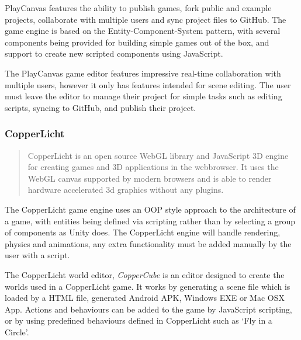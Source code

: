 \documentclass[a4paper, 12pt]{article}
\begin{document}
PlayCanvas features the ability to publish games, fork public and example projects, collaborate with multiple users and sync project files to GitHub. The game engine is based on the Entity-Component-System pattern, with several components being provided for building simple games out of the box, and support to create new scripted components using JavaScript.\cite{playcanvas}

The PlayCanvas game editor features impressive real-time collaboration with multiple users, however it only has features intended for scene editing. The user must leave the editor to manage their project for simple tasks such as editing scripts, syncing to GitHub, and publish their project.

\subsubsection{CopperLicht}
\begin{quote}
CopperLicht is an open source WebGL library and JavaScript 3D engine for creating games and 3D applications in the webbrowser. It uses the WebGL canvas supported by modern browsers and is able to render hardware accelerated 3d graphics without any plugins.\cite{copperlicht}
\end{quote}

The CopperLicht game engine uses an OOP style approach to the architecture of a game, with entities being defined via scripting rather than by selecting a group of components as Unity does. The CopperLicht engine will handle rendering, physics and animations, any extra functionality must be added manually by the user with a script.\cite{copperlichtfeatures}

The CopperLicht world editor, \emph{CopperCube} is an editor designed to create the worlds used in a CopperLicht game. It works by generating a scene file which is loaded by a HTML file, generated Android APK, Windows EXE or Mac OSX App.\cite{coppercubefeatures} Actions and behaviours can be added to the game by JavaScript scripting, or by using predefined behaviours defined in CopperLicht such as `Fly in a Circle'.\cite{copperlichtbehaviours}
\end{document}
